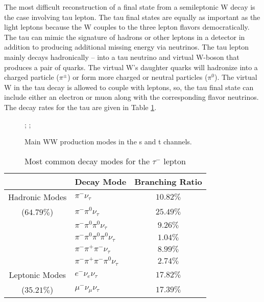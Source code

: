   The most difficult reconstruction of a final state from a semileptonic W decay is the case involving tau lepton. The tau final states are equally as important as the light leptons because the W couples to the three lepton flavors democratically. The tau can mimic the signature of hadrons or other leptons in a detector in addition to producing additional missing energy via neutrinos.  The tau lepton mainly decays hadronically -- into a tau neutrino and virtual W-boson that produces a pair of quarks. The virtual W's daughter quarks will hadronize into a charged particle ($\pi^\pm$) or form more charged or neutral particles ($\pi^0$). The virtual W in the tau decay is allowed to couple with leptons, so, the tau final state can include either an electron or muon along with the corresponding flavor neutrinos. The decay rates for the tau are given in Table \ref{tab:taudecay}.
\begin{figure}
\centering
{};
    ;
\caption{\label{fig:wwdiag} Main WW production modes in the s and t channels. }
\end{figure}
\begin{table}
\centering
 \begin{tabular}{|c|l|c|} 
 
 \hline
       & Decay Mode & Branching Ratio  \\ \hline \hline
    Hadronic Modes  & $\pi^- \nu_\tau$  & $10.82\%$  \\
      	($64.79\%$) & $\pi^- \pi^0 \nu_\tau$ & $25.49\%$ \\
     				& $\pi^- \pi^0 \pi^0 \nu_\tau$  & $9.26\%$  \\
     				& $\pi^- \pi^0 \pi^0 \pi^0 \nu_\tau$  & $1.04\%$   \\
      				& $\pi^- \pi^+ \pi^- \nu_\tau$  & $8.99\%$      \\ 
      				& $\pi^- \pi^+ \pi^- \pi^0 \nu_\tau$  & $2.74\%$  \\ \hline
    			    
    Leptonic Modes  & $e^- \nu_e \nu_\tau$ & $17.82\%$   \\
    	($35.21\%$)	& $\mu^- \nu_\mu \nu_\tau $  & $17.39\%$      \\ \midrule \hline
      				
     				
\end{tabular}
        \caption{\label{tab:taudecay}Most common decay modes for the $\tau^-$ lepton \cite{pdg}}
\end{table}
       
